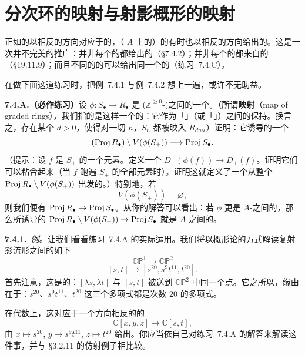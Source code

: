 
\section{分次环的映射与射影概形的映射}

正如\trRing{}的\trMap{}以相反的方向对应于\trAffineScheme{}的\trMap，（\trBaseRing{} $A$ 上的）\trGradedRing{}的\trMap{}有时也以相反的方向给出\trProjectiveScheme{}的\trMap。这是一次并不完美的推广：并非每个\trGradedRing{}的\trMap{}都给出\trProjectiveScheme{}的\trMap（\S7.4.2）；并非每个\trProjectiveScheme{}的\trMap{}都来自\trGradedRing{}的\trMap（\S19.11.9）；而且不同的\trGradedRing{}的\trMap{}可以给出同一个\trScheme{}的\trMap（练习~7.4.C）。

在做下面这道练习时，把例~7.4.1 与例~7.4.2 想上一遍，或许不无助益。

\textbf{7.4.A.（必作练习）}\quad 设 $\phi\colon S_\bullet\longrightarrow R_\bullet$ 是 ($\mathbb{Z}^{\ge0}$-)\trGradedRing{}之间的一个\trMorphism。（所谓\textbf{\trGradedRing{}映射}（map of graded rings），我们指的是这样一个\trRing{}的\trMap：它作为「\trGrading{}\trAbelianSemigroup」（或「\trGrading{}\trCommutativeMonoid」）之间的\trMap{}保持\trGrading。换言之，存在某个 $d>0$，使得对一切 $n$，$S_n$ 都被映入 $R_{dn}$。）证明：它诱导\trScheme{}的一个\trMorphism
\[
(\operatorname{Proj} R_\bullet)\setminus V(\phi(S_+))\longrightarrow\operatorname{Proj} S_\bullet.
\]
（提示：设 $f$ 是 $S_+$ 的一个\trHomogeneous{}元素。定义一个\trMap{} $D_+(\phi(f))\to D_+(f)$。证明它们可以粘合起来（当 $f$ 跑遍 $S_+$ 的全部\trHomogeneous{}元素时）。证明这就定义了一个从整个 $\operatorname{Proj} R_\bullet\setminus V(\phi(S_+))$ 出发的\trMap。）特别地，若
\begin{equation*}\tag{7.4.0.1}\label{eq:vphi-s-plus-empty}
V(\phi(S_+))=\varnothing,
\end{equation*}
则我们便有\trMorphism{} $\operatorname{Proj} R_\bullet\to\operatorname{Proj} S_\bullet$。从你的解答可以看出：若 $\phi$ 更是 $A$-\trAlgebra{}之间的\trMorphism，那么所诱导的\trMorphism{} $\operatorname{Proj} R_\bullet\setminus V(\phi(S_+))\to\operatorname{Proj} S_\bullet$ 就是 $A$-\trScheme{}之间的\trMorphism。

\textbf{7.4.1.}\ \emph{例。}\quad 让我们看看练习~7.4.A 的实际运用。我们将以概形论的方式解读复射影流形之间的如下\trMap
\[
\mathbb{CP}^1\longrightarrow\mathbb{CP}^2
\]
\[
[s,t]\longmapsto[s^{20},s^9t^{11},t^{20}].
\]
首先注意，这是\trWellDefined{}的：$[\lambda s,\lambda t]$ 与 $[s,t]$ 被送到 $\mathbb{CP}^2$ 中同一个点。它之所以\trWellDefined，缘由在于：$s^{20}$、$s^9t^{11}$、$t^{20}$ 这三个多项式都是次数 $20$ 的\trHomogeneous{}多项式。

在代数上，这对应于一个方向相反的\trGradedRing{}的\trMap
\[
\mathbb{C}[x,y,z]\longrightarrow\mathbb{C}[s,t],
\]
由 $x\mapsto s^{20}$, $y\mapsto s^9t^{11}$, $z\mapsto t^{20}$ 给出。你应当依自己对练习~7.4.A 的解答来解读这件事，并与 \S3.2.11 的仿射例子相比较。


